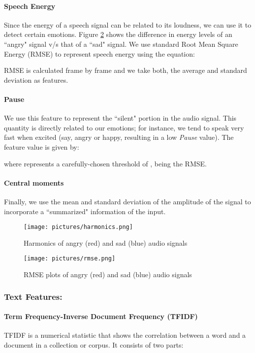 \documentclass[conference]{IEEEtran}
\begin{document}
\paragraph{Speech Energy} Since the energy of a speech signal can be related to its loudness, we can use it to detect certain emotions. Figure \ref{fig:rmse} shows the difference in energy levels of an ``angry" signal v/s that of a ``sad" signal. We use standard Root Mean Square Energy (RMSE) to represent speech energy using the equation:



RMSE is calculated frame by frame and we take both, the average and standard deviation as features.

\paragraph{Pause} We use this feature to represent the ``silent" portion in the audio signal. This quantity is directly related to our emotions; for instance, we tend to speak very fast when excited (say, angry or happy, resulting in a low \textit{Pause} value). The feature value is given by:



where  represents a carefully-chosen threshold of ,  being the RMSE.

\paragraph{Central moments} Finally, we use the mean and standard deviation of the amplitude of the signal to incorporate a ``summarized" information of the input.

\begin{figure}[h!]
	\centering
	\texttt{[image: pictures/harmonics.png]}
	\caption{Harmonics of angry (red) and sad (blue) audio signals}
	\label{fig:harmonic}
\end{figure}

\begin{figure}[h!]
    \centering
	\texttt{[image: pictures/rmse.png]}
	\caption{RMSE plots of angry (red) and sad (blue) audio signals}
	\label{fig:rmse}
\end{figure}

\subsubsection{Text Features:}
\paragraph{Term Frequency-Inverse Document Frequency (TFIDF)} TFIDF is a numerical statistic that shows the correlation between a word and a document in a collection or corpus. It consists of two parts:
\end{document}
